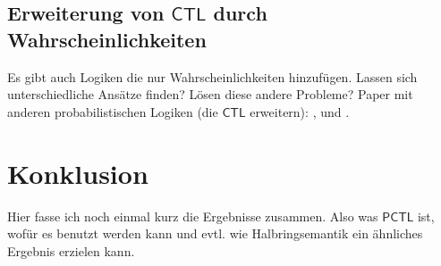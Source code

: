 \documentclass{lni}
\newcommand{\CTL}{\mathsf{CTL}}
\newcommand{\PCTL}{\mathsf{PCTL}}
\begin{document}
\subsection{Erweiterung von $\CTL$ durch Wahrscheinlichkeiten}

Es gibt auch Logiken die nur Wahrscheinlichkeiten hinzufügen. Lassen sich unterschiedliche Ansätze finden? Lösen diese andere Probleme? Paper mit anderen probabilistischen Logiken (die $\CTL$ erweitern): \cite{hart1984probabilistic}, \cite{lehmann1982reasoning} und \cite{christoff1992reasoning}.

\section{Konklusion}

Hier fasse ich noch einmal kurz die Ergebnisse zusammen. Also was $\PCTL$ ist, wofür es benutzt werden kann und evtl. wie Halbringsemantik ein ähnliches Ergebnis erzielen kann.


\end{document}

